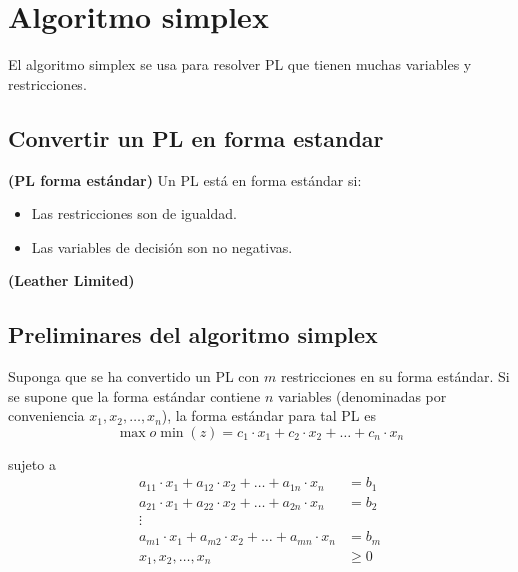 \documentclass[../main.tex]{subfiles}
\begin{document}
\section{Algoritmo simplex} 
    El algoritmo simplex se usa para resolver PL que tienen muchas variables y restricciones.
    
    \subsection{Convertir un PL en forma estandar}
        \begin{definition} \textbf{(PL forma estándar)}
            Un PL está en forma estándar si:
            \begin{itemize}
                \item Las restricciones son de igualdad.
                \item Las variables de decisión son no negativas.
            \end{itemize}
        \end{definition}

        \begin{example} \textbf{(Leather Limited)}\\
            
        \end{example}

    \subsection{Preliminares del algoritmo simplex}
        Suponga que se ha convertido un PL con $m$ restricciones en su forma estándar. Si se supone que la forma estándar contiene $n$ variables (denominadas por conveniencia $x_1, x_2, \dots, x_n$), la forma estándar para tal PL es
        \begin{equation}
            \max o \min(z) = c_1 \cdot x_1 + c_2 \cdot x_2 + \dots + c_n \cdot x_n
        \end{equation}

        sujeto a
        \begin{equation}
            \begin{aligned}
                a_{11} \cdot x_1 + a_{12} \cdot x_2 + \dots + a_{1n} \cdot x_n &= b_1 \\
                a_{21} \cdot x_1 + a_{22} \cdot x_2 + \dots + a_{2n} \cdot x_n &= b_2 \\
                \vdots \\
                a_{m1} \cdot x_1 + a_{m2} \cdot x_2 + \dots + a_{mn} \cdot x_n &= b_m \\
                x_1, x_2, \dots, x_n &\geq 0 \\
            \end{aligned}
            \label{eq:forma_estandar}
        \end{equation}
\end{document}
